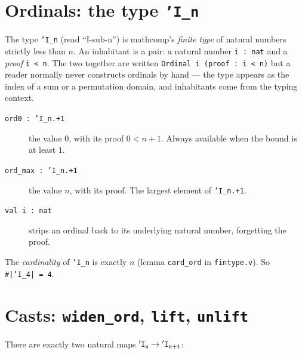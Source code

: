 \section{Ordinals: the type \texttt{'I\_n}}

The type \texttt{'I\_n} (read ``I-sub-n'') is mathcomp's
\emph{finite type} of natural numbers strictly less than $n$. An
inhabitant is a pair: a natural number \texttt{i : nat} and a
\emph{proof} \texttt{i\,<\,n}. The two together are written
\texttt{Ordinal i (proof : i\,<\,n)} but a reader normally never
constructs ordinals by hand --- the type appears as the index of a
sum or a permutation domain, and inhabitants come from the typing
context.

\begin{description}
  \item[\texttt{ord0 : 'I\_n.+1}] the value $0$, with its proof
    $0 < n+1$. Always available when the bound is at least $1$.
  \item[\texttt{ord\_max : 'I\_n.+1}] the value $n$, with its proof.
    The largest element of \texttt{'I\_n.+1}.
  \item[\texttt{val i : nat}] strips an ordinal back to its
    underlying natural number, forgetting the proof.
\end{description}

\noindent The \emph{cardinality} of \texttt{'I\_n} is exactly $n$
(lemma \texttt{card\_ord} in \texttt{fintype.v}). So
\texttt{\#|'I\_4|\,=\,4}.

\section{Casts: \texttt{widen\_ord}, \texttt{lift}, \texttt{unlift}}
\label{sec:casts}

There are exactly two natural maps $\mathtt{'I_{n}} \to \mathtt{'I_{n+1}}$:


